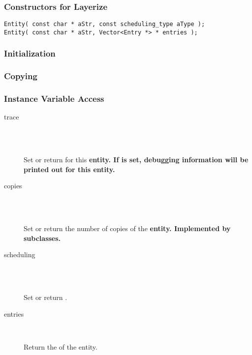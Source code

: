 \subsubsection{Constructors for Layerize}

\begin{verbatim}
Entity( const char * aStr, const scheduling_type aType );
Entity( const char * aStr, Vector<Entry *> * entries );
\end{verbatim}

\subsubsection{Initialization}
\subsubsection{Copying}
\subsubsection{Instance Variable Access}

\begin{description}
\item[trace] \texonly{---} \\
\\

Set or return  for this
\bf{entity}.  If  is set, debugging information will be
printed out for this entity.

\item[copies] \texonly{---} \\
\\

Set or return the number of copies of the \bf{entity}.  Implemented
by subclasses.

\item[scheduling] \texonly{---} \\
\\

Set or return .

\item[entries] \texonly{---} \\

Return the  of the entity.  

\end{description}

